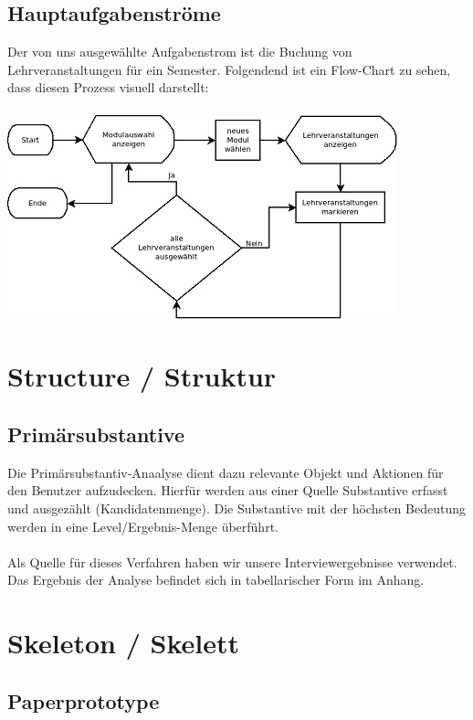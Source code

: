 \documentclass{article}
\begin{document}
\subsection{Hauptaufgabenströme}

Der von uns ausgewählte Aufgabenstrom ist die Buchung von Lehrveranstaltungen für ein Semester. Folgendend ist ein Flow-Chart zu sehen, dass diesen Prozess visuell darstellt:\\
\\
\includegraphics{flowchart.jpg}

\newpage

\section{Structure / Struktur}

\subsection{Primärsubstantive}

Die Primärsubstantiv-Anaalyse dient dazu relevante Objekt und Aktionen für den Benutzer aufzudecken. Hierfür werden aus einer Quelle Substantive erfasst und ausgezählt (Kandidatenmenge). Die Substantive mit der höchsten Bedeutung werden in eine Level/Ergebnis-Menge überführt.\\
\\
Als Quelle für dieses Verfahren haben wir unsere Interviewergebnisse verwendet. Das Ergebnis der Analyse befindet sich in tabellarischer Form im Anhang.

\newpage

\section{Skeleton / Skelett}

\subsection{Paperprototype}
\end{document}
